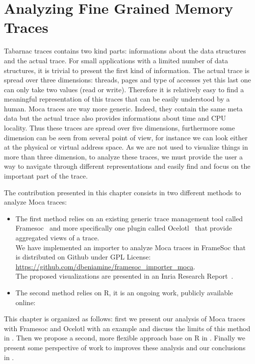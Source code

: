 \chapter{Analyzing Fine Grained Memory Traces}

\gls{Tabarnac} traces contains two kind parts: informations about the data structures and the actual trace.
For small applications with a limited number of data structures, it is trivial to present the first kind of information.
The actual trace is spread over three dimensions: threads, pages and type of accesses yet this last one can only take two values (read or write).
Therefore it is relatively easy to find a meaningful representation of this traces that can be easily understood by a human.
\gls{Moca} traces are way more generic.
Indeed, they contain the same meta data but the actual trace also provides informations about time and \gls{CPU} locality.
Thus these traces are spread over five dimensions, furthermore some dimension can be seen from several point of view, for instance we can look either at the physical or virtual address space.
As we are not used to visualize things in more than three dimension, to analyze these traces, we must provide the user a way to navigate through different representations and easily find and focus on the important part of the trace.

The contribution presented in this chapter consists in two different methods to analyze \gls{Moca} traces:
\begin{itemize}
    \item The first method relies on an existing generic trace management tool called \gls{Framesoc}~\cite{Pagano14frameSoC} and more specifically one plugin called \gls{Ocelotl}~\cite{Dosimont14Ocelotl} that provide aggregated views of a trace.\\
        We have implemented an importer to analyze \gls{Moca} traces in \gls{FrameSoc} that is distributed on Github under GPL License:\\
        \url{https://github.com/dbeniamine/framesoc\_importer\_moca}.\\
        The proposed visualizations are presented in an Inria Research Report~\cite{Beniamine15Memory}.
    \item The second method relies on \gls{R}, it is an ongoing work, publicly available online:
\end{itemize}

This chapter is organized as follows: first we present our analysis of \gls{Moca} traces with \gls{Framesoc} and \gls{Ocelotl} with an example and discuss the limits of this method in .
Then we propose a second, more flexible approach base on \gls{R} in .
Finally we present some perspective of work to improves these analysis and our conclusions in .


